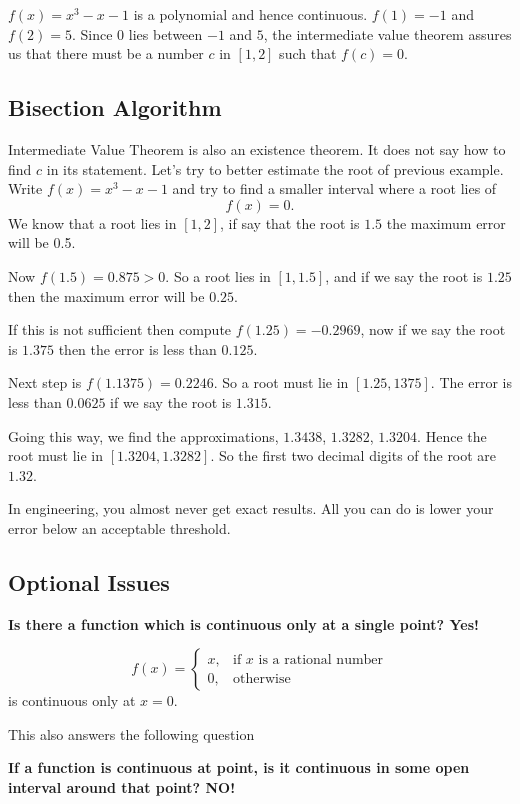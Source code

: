 \documentclass[calc1-main.tex]{subfiles}
\begin{document}
\begin{solution}
	$f(x) = x^3 - x - 1$ is a polynomial and hence continuous. $f(1) = -1$ and $f(2) = 5$. Since $0$ lies between $-1$ and $5$, the intermediate value theorem assures us that there must be a number $c$ in $[1, 2]$ such that $f(c) = 0$.
\end{solution}

\subsection*{Bisection Algorithm}
Intermediate Value Theorem is also an existence theorem. It does not say how to find $c$ in its statement. Let's try to better estimate the root of previous example. Write $f(x) = x^3 - x - 1$ and try to find a smaller interval where a root lies of
\[
	f(x) = 0.
\]
We know that a root lies in $[1, 2]$, if say that the root is $1.5$ the maximum error will be 0.5.

Now $f(1.5)=0.875 > 0$. So a root lies in $[1, 1.5]$, and if we say the root is $1.25$ then the maximum error will be $0.25$.

If this is not sufficient then compute $f(1.25)=-0.2969$, now if we say the root is $1.375$ then the error is less than $0.125$.

Next step is $f(1.1375) = 0.2246$. So a root must lie in $[1.25, 1375]$. The error is less than $0.0625$ if we say the root is $1.315$.

Going this way, we find the approximations, $1.3438$, $1.3282$, $1.3204$. Hence the root must lie in $[1.3204, 1.3282]$. So the first two decimal digits of the root are $1.32$.

In engineering, you almost never get exact results. All you can do is lower your error below an acceptable threshold.

\subsection*{Optional Issues}
\textbf{Is there a function which is continuous only at a single point? Yes!}
\begin{example}
  \[
    f(x) =
    \begin{cases}
      x, & \text{if $x$ is a rational number} \\
      0, & \text{otherwise}
    \end{cases}
  \]
  is continuous only at $x=0$.
\end{example}
This also answers the following question

\textbf{If a function is continuous at point, is it continuous in some open interval around that point? NO!}
\end{document}
